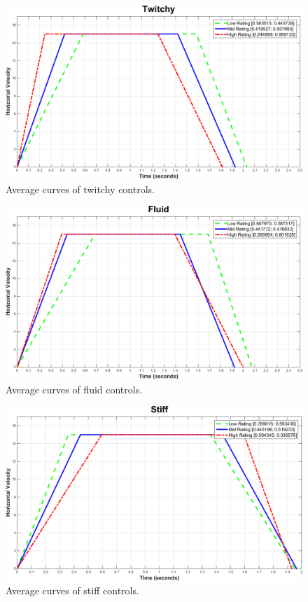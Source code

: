 \begin{figure}[htbp]
\centering
\includegraphics[width=0.9\columnwidth]{Pics/Curves/Twitchy_curve}
\caption{Average curves of twitchy controls.}
\label{fig:curve_twitchy}
\end{figure}

\begin{figure}[htbp]
\centering
\includegraphics[width=0.9\columnwidth]{Pics/Curves/Fluid_curve}
\caption{Average curves of fluid controls.}
\label{fig:curve_fluid}
\end{figure}

\begin{figure}[htbp]
\centering
\includegraphics[width=0.9\columnwidth]{Pics/Curves/Stiff_curve}
\caption{Average curves of stiff controls.}
\label{fig:curve_stiff}
\end{figure}

